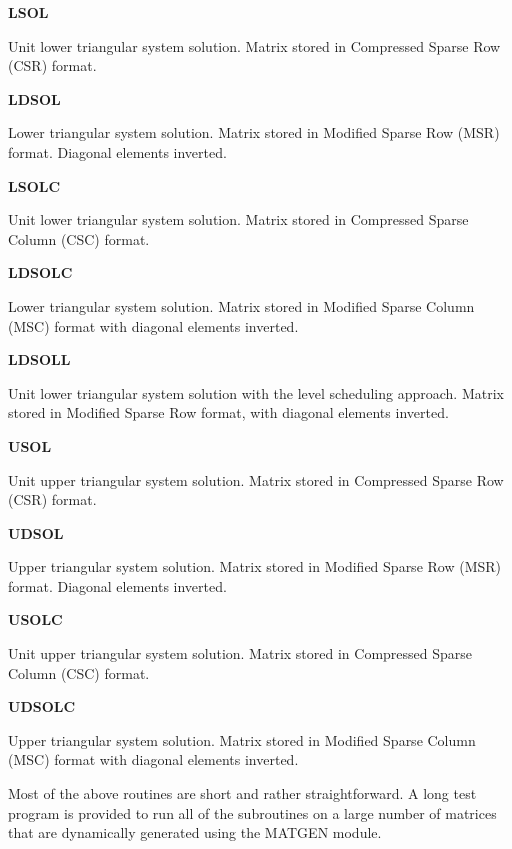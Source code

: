 \documentclass[12pt]{article}
\def\marg#1{\parbox[b]{1.3in}{\bf #1}}
\def\disp#1{\parbox[t]{4.62in}{#1} \vskip 0.2in }
\begin{document}
\marg{ LSOL } 
\disp{  Unit lower triangular system solution. Matrix stored in
Compressed Sparse Row (CSR) format. }

\marg{ LDSOL  }\disp{Lower triangular system solution. Matrix stored in
Modified Sparse Row (MSR) format. Diagonal elements inverted. }

\marg{ LSOLC  }\disp{ 
Unit lower triangular system solution. Matrix stored in
 Compressed Sparse Column (CSC) format.   }

\marg{ LDSOLC }\disp{  
Lower triangular system solution. Matrix stored in
Modified Sparse Column (MSC) format with diagonal elements inverted. }

\marg{ LDSOLL }\disp{ 
Unit lower triangular system solution with the level scheduling
approach.  Matrix 
stored in Modified Sparse Row format, with diagonal elements inverted.}

\marg{ USOL }\disp{  Unit upper triangular system solution. 
Matrix stored in Compressed Sparse Row (CSR) format. }

\marg{ UDSOL  }\disp{  Upper triangular system solution. 
Matrix stored in Modified Sparse Row (MSR) format. Diagonal 
elements inverted. }

\marg{ USOLC  }\disp{ 
Unit upper triangular system solution. Matrix stored in
Compressed Sparse Column (CSC) format.   } 

\marg{ UDSOLC }\disp{  
Upper triangular system solution. Matrix stored in
Modified Sparse Column (MSC) format with diagonal elements inverted. }

\vskip 0.3in
Most of the above routines are  short and rather straightforward.
A long test program  is provided to run all of the subroutines
on a large number of matrices that are dynamically generated
using the MATGEN module. 
\end{document}

